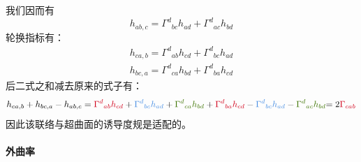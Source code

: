 \documentclass[hyperref, UTF8, a4paper]{ctexart}
\begin{document}
我们因而有
\begin{equation*}
	h_{ab,c} =\Gamma ^{d}{}_{bc} h_{ad} +\Gamma ^{d}{}_{ac} h_{bd}
\end{equation*}
轮换指标有：
\begin{gather*}
	h_{ca,b} =\Gamma ^{d}{}_{ab} h_{cd} +\Gamma ^{d}{}_{bc} h_{ad}\\
	h_{bc,a} =\Gamma ^{d}{}_{ca} h_{bd} +\Gamma ^{d}{}_{ba} h_{cd}
\end{gather*}
后二式之和减去原来的式子有：
\begin{equation*}
	h_{ca,b} +h_{bc,a} -h_{ab,c} =\textcolor[rgb]{0.82,0.01,0.11}{\Gamma }\textcolor[rgb]{0.82,0.01,0.11}{^{d}{}}\textcolor[rgb]{0.82,0.01,0.11}{_{ab}}\textcolor[rgb]{0.82,0.01,0.11}{h}\textcolor[rgb]{0.82,0.01,0.11}{_{cd}} +\textcolor[rgb]{0.29,0.56,0.89}{\Gamma }\textcolor[rgb]{0.29,0.56,0.89}{^{d}{}}\textcolor[rgb]{0.29,0.56,0.89}{_{bc}}\textcolor[rgb]{0.29,0.56,0.89}{h}\textcolor[rgb]{0.29,0.56,0.89}{_{ad}} +\textcolor[rgb]{0.25,0.46,0.02}{\Gamma }\textcolor[rgb]{0.25,0.46,0.02}{^{d}{}}\textcolor[rgb]{0.25,0.46,0.02}{_{ca}}\textcolor[rgb]{0.25,0.46,0.02}{h}\textcolor[rgb]{0.25,0.46,0.02}{_{bd}} +\textcolor[rgb]{0.82,0.01,0.11}{\Gamma }\textcolor[rgb]{0.82,0.01,0.11}{^{d}{}}\textcolor[rgb]{0.82,0.01,0.11}{_{ba}}\textcolor[rgb]{0.82,0.01,0.11}{h}\textcolor[rgb]{0.82,0.01,0.11}{_{cd}} -\textcolor[rgb]{0.29,0.56,0.89}{\Gamma }\textcolor[rgb]{0.29,0.56,0.89}{^{d}{}}\textcolor[rgb]{0.29,0.56,0.89}{_{bc}}\textcolor[rgb]{0.29,0.56,0.89}{h}\textcolor[rgb]{0.29,0.56,0.89}{_{ad}} -\textcolor[rgb]{0.25,0.46,0.02}{\Gamma }\textcolor[rgb]{0.25,0.46,0.02}{^{d}{}}\textcolor[rgb]{0.25,0.46,0.02}{_{ac}}\textcolor[rgb]{0.25,0.46,0.02}{h}\textcolor[rgb]{0.25,0.46,0.02}{_{bd}}\textcolor[rgb]{0,0,0}{=2}\textcolor[rgb]{0.82,0.01,0.11}{\Gamma }\textcolor[rgb]{0.82,0.01,0.11}{_{cab}}
\end{equation*}
因此该联络与超曲面的诱导度规是适配的。


\paragraph{外曲率}
\end{document}
